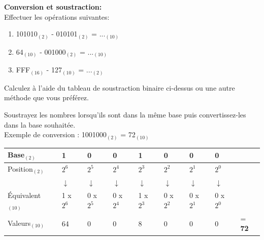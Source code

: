 \begin{Exercice}[20 minutes] \textbf{Conversion et soustraction:}\\
    Effectuer les opérations suivantes:
    \begin{enumerate}
        \item 101010$_{(2)}$ - 010101$_{(2)}$ = ...$_{(10)}$
        \item 64$_{(10)}$ - 001000$_{(2)}$ = ...$_{(10)}$
        \item FFF$_{(16)}$ - 127$_{(10)}$ = ...$_{(2)}$
    \end{enumerate}
    \begin{conseil}
        Calculez à l'aide du tableau de soustraction binaire ci-dessus ou une autre méthode que vous préférez.
            
            Soustrayez les nombres lorsqu'ils sont dans la même base puis convertissez-les dans la base souhaitée.\\
            
            Exemple de conversion : 1001000$_{(2)}$ = 72$_{(10)}$\\
            \begin{tabular}
                {| C{0.15\textwidth} | C{0.07\textwidth} | C{0.07\textwidth} | C{0.07\textwidth} | C{0.07\textwidth} | C{0.07\textwidth} | C{0.07\textwidth} | C{0.07\textwidth} | C{0.06\textwidth} |} 
                \hline
                Base$_{(2)}$ & \textbf{1} & \textbf{0} & \textbf{0} & \textbf{1} & \textbf{0} & \textbf{0} & \textbf{0} & \textbf{}\\ [0.5ex]
                \hline
                Position$_{(2)}$ & $2^6$ & $2^5$ & $2^4$ & $2^3$ & $2^2$ & $2^1$ & $2^0$ & \\ [0.5ex] 
                \hline
                 & $\downarrow$ & $\downarrow$ & $\downarrow$ & $\downarrow$ & $\downarrow$ & $\downarrow$ & $\downarrow$ & \\ [0.5ex] 
                \hline
                Équivalent$_{(10)}$ & 1 x $2^6$ & 0 x $2^5$ & 0 x $2^4$ & 1 x $2^3$ & 0 x $2^2$ & 0 x $2^1$ & 0 x $2^0$ & \\ [0.5ex]     
                \hline
                Valeurs$_{(10)}$ & 64 & 0 & 0 & 8 & 0 & 0 & 0 & = \textbf{72} \\ [0.5ex]
                \hline
            \end{tabular}\\\\


\end{conseil}
\end{Exercice}
